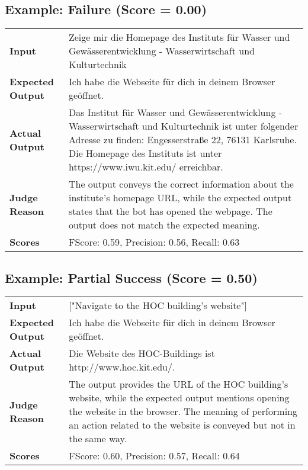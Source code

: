 \documentclass{article}
\begin{document}
\subsection*{Example: Failure (Score = 0.00)}
\begin{longtable}{p{} p{}}
\textbf{Input} & Zeige mir die Homepage des Instituts für Wasser und Gewässerentwicklung - Wasserwirtschaft und Kulturtechnik \\
\textbf{Expected Output} & Ich habe die Webseite für dich in deinem Browser geöffnet. \\
\textbf{Actual Output} & Das Institut für Wasser und Gewässerentwicklung - Wasserwirtschaft und Kulturtechnik ist unter folgender Adresse zu finden: Engesserstraße 22, 76131 Karlsruhe. Die Homepage des Instituts ist unter https://www.iwu.kit.edu/ erreichbar. \\
\textbf{Judge Reason} & The output conveys the correct information about the institute's homepage URL, while the expected output states that the bot has opened the webpage. The output does not match the expected meaning. \\
\textbf{Scores} & FScore: 0.59, Precision: 0.56, Recall: 0.63 \\
\end{longtable}
\subsection*{Example: Partial Success (Score = 0.50)}
\begin{longtable}{p{} p{}}
\textbf{Input} & ["Navigate to the HOC building's website"] \\
\textbf{Expected Output} & Ich habe die Webseite für dich in deinem Browser geöffnet. \\
\textbf{Actual Output} & Die Website des HOC-Buildings ist http://www.hoc.kit.edu/. \\
\textbf{Judge Reason} & The output provides the URL of the HOC building's website, while the expected output mentions opening the website in the browser. The meaning of performing an action related to the website is conveyed but not in the same way. \\
\textbf{Scores} & FScore: 0.60, Precision: 0.57, Recall: 0.64 \\
\end{longtable}
\end{document}
